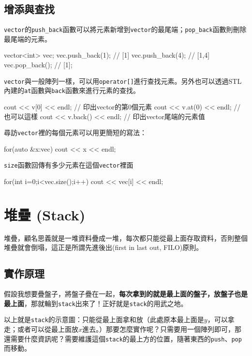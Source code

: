 \documentclass[main.tex]{subfiles}
\begin{document}
\subsection{增添與查找}
\texttt{vector}的\texttt{push\_back}函數可以將元素新增到\texttt{vector}的最尾端；\texttt{pop\_back}函數則刪除最尾端的元素。
\begin{C++}
vector<int> vec;
vec.push_back(1); // [1]
vec.push_back(4); // [1,4]
vec.pop_back(); // [1];
\end{C++}
\indent\indent\texttt{vector}與一般陣列一樣，可以用\texttt{operator[]}進行查找元素。另外也可以透過STL內建的\texttt{at}函數與\texttt{back}函數來進行元素的查找。
\begin{C++}
cout << v[0] << endl;
// 印出vector的第0個元素
cout << v.at(0) << endl;
// 也可以這樣
cout << v.back() << endl;
// 印出vector尾端的元素值
\end{C++}
\indent\indent 尋訪\texttt{vector}裡的每個元素可以用更簡短的寫法：
\begin{C++}
for(auto &x:vec){
	cout << x << endl;
}
\end{C++}
\indent\indent\texttt{size}函數回傳有多少元素在這個\texttt{vector}裡面
\begin{C++}
for(int i=0;i<vec.size();i++)
	cout << vec[i] << endl;
\end{C++}

\section{堆疊 (Stack)}

堆疊，顧名思義就是一堆資料疊成一堆，每次都只能從最上面存取資料，否則整個堆疊就會倒塌，這正是所謂先進後出(first in last out, FILO)原則。

\subsection{實作原理}
假設我想要疊盤子，將盤子疊在一起，\textbf{每次拿到的就是最上面的盤子，放盤子也是最上面}，那就輪到\texttt{stack}出來了！正好就是\texttt{stack}的用武之地。
\begin{center}
\end{center}
以上就是\texttt{stack}的示意圖：只能從最上面拿和放（此處原本最上面是$y$，可以拿走；或者可以從最上面放$x$進去。）那要怎麼實作呢？只需要用一個陣列即可，那還需要什麼資訊呢？需要維護這個\texttt{stack}的最上方的位置，隨著東西的\texttt{push}、\texttt{pop}而移動。
\end{document}
